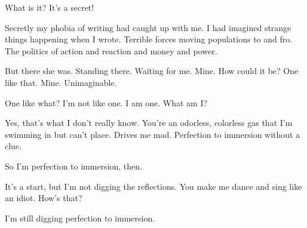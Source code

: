 

What is it?  It's a secret!  

Secretly my phobia of writing had caught up with me.  I had imagined
strange things happening when I wrote.  Terrible forces moving
populations to and fro.  The politics of action and reaction and money
and power.

But there she was.  Standing there.  Waiting for me.  Mine.  How could
it be?  One like that.  Mine.  Unimaginable.

One like what?  I'm not like one.  I am one.  What am I?

Yes, that's what I don't really know.  You're an odorless, colorless
gas that I'm swimming in but can't place.  Drives me mad.  Perfection
to immersion without a clue.

So I'm perfection to immersion, then.

It's a start, but I'm not digging the reflections.  You make me dance
and sing like an idiot.  How's that?

I'm still digging perfection to immersion.

\bye
